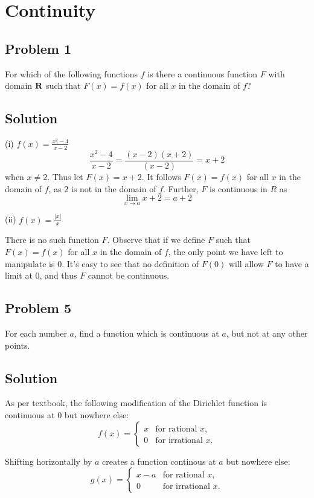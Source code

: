 \section{Continuity}

\subsection*{Problem 1}
For which of the following functions $f$ is there a continuous function $F$ with domain $\mathbf{R}$ such that $F(x)=f(x)$ for all $x$ in the domain of $f$?

\subsection*{Solution}
(i) $f(x)=\frac{x^2-4}{x-2}$
\[\frac{x^2-4}{x-2}=\frac{(x-2)(x+2)}{(x-2)}=x+2\]
when $x\neq 2$. Thus let $F(x)=x+2$. It follows $F(x)=f(x)$ for all $x$ in the domain of $f$, as $2$ is not in the domain of $f$. Further, $F$ is continuous in $R$ as
\[\lim_{x\to a}x+2=a+2\]

(ii) $f(x)=\frac{|x|}{x}$

There is no such function $F$. Observe that if we define $F$ such that $F(x)=f(x)$ for all $x$ in the domain of $f$, the only point we have left to manipulate is $0$. It's easy to see that no definition of $F(0)$ will allow $F$ to have a limit at $0$, and thus $F$ cannot be continuous.

\subsection*{Problem 5}
For each number $a$, find a function which is continuous at $a$, but not at any other points.

\subsection*{Solution}
As per textbook, the following modification of the Dirichlet function
is continuous at $0$ but nowhere else:
\[
f(x) = 
\begin{cases} 
x & \text{for rational } x,\\
0 & \text{for irrational } x.
\end{cases}
\]

Shifting horizontally by $a$ creates a function continous at $a$ but
nowhere else:
\[
g(x) = 
\begin{cases} 
x-a & \text{for rational } x,\\
0 & \text{for irrational } x.
\end{cases}
\]


